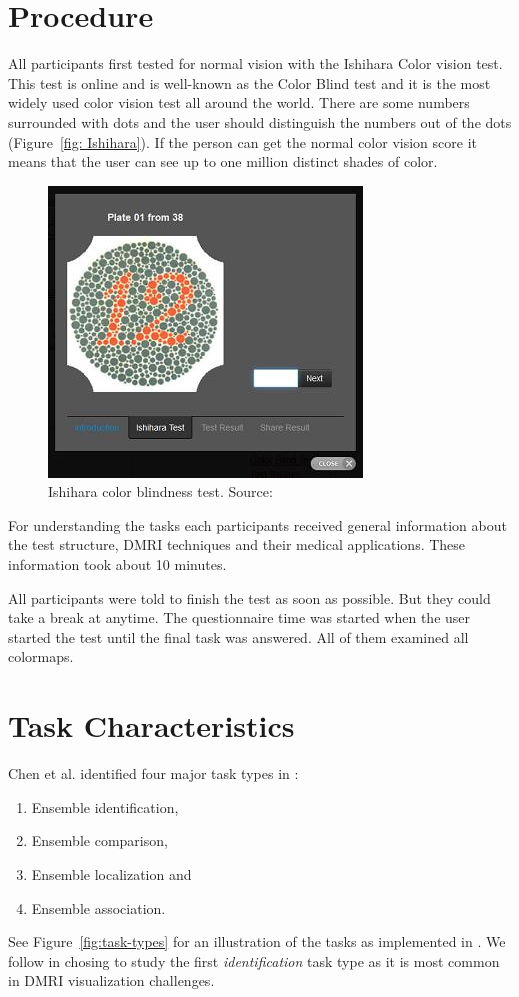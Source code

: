 \documentclass[a4paper, 12pt]{report}
\begin{document}
\section{Procedure}
All participants first tested for normal vision with the Ishihara Color vision test. This test is online and is well-known as the Color Blind test and it is the most widely used color vision test all around the world. There are some numbers surrounded with dots and the user should distinguish the numbers out of the dots (Figure~\ref{fig: Ishihara}). If the person can get the normal color vision score it means that the user can see up to one million distinct shades of color.
\begin{figure}[ht]
    \centering
    \includegraphics[width = 0.6\columnwidth]{Ishihara}
    \caption{Ishihara color blindness test. Source:  \cite{www.color-blindness.com}}
    \label{fig:Ishihara}
\end{figure}

For understanding the tasks each participants received general information about the test structure, DMRI techniques and their medical applications. These information took about 10 minutes. 

All participants were told to finish the test as soon as possible. But they could take a break at anytime. The questionnaire time was started when the user started the test until the final task was answered. 
All of them examined all colormaps.

\section{Task Characteristics}

Chen et al. identified four major task types in \cite{chen}: 
\begin{enumerate}
	\item Ensemble identification, 
	\item Ensemble comparison, 
	\item Ensemble localization and
	\item Ensemble association.
\end{enumerate}
See Figure~\ref{fig:task-types} for an illustration of the tasks as implemented in \cite{chen}. We follow \cite{chen} in chosing to study the first \emph{identification} task type as it is most common in DMRI visualization challenges. 
\end{document}
